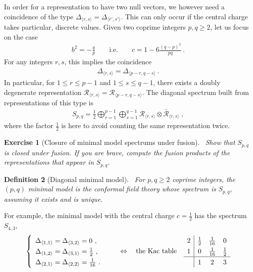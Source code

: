 \documentclass[12pt, a4paper]{article}
\theoremstyle{break}
\newtheorem{exo}{Exercise}[section]
\newtheorem{defn}[exo]{Definition}
\begin{document}
In order for a representation to have two null vectors, we however need a coincidence of 
the type $\Delta_{\langle r,s \rangle} = \Delta_{\langle r',s' \rangle}$. 
This can only occur if the central charge takes particular, discrete values. 
Given two coprime integers $p,q\geq 2$, let us focus on the case 
\begin{align} 
 b^2 = - \frac{q}{p} \qquad \text{i.e.} \qquad c = 1-6\frac{(q-p)^2}{pq}\ .
 \label{eq:bcmin}
\end{align}
For any integers $r,s$, this implies the coincidence 
\begin{align}
 \Delta_{\langle r,s \rangle} = \Delta_{\langle p-r, q-s\rangle}\ .
\end{align}
In particular, for $1\leq r\leq p-1$ and $1\leq s\leq q-1$, there exists a doubly degenerate representation $\mathcal{R}_{\langle r, s\rangle} = \mathcal{R}_{\langle p-r, q-s\rangle}$. The diagonal spectrum built from representations of this type is 
\begin{align}
 S_{p, q} = \frac12 \bigoplus_{r=1}^{p-1} \bigoplus_{s=1}^{q-1} \mathcal{R}_{\langle r,s \rangle}\otimes \mathcal{\bar{R}}_{\langle r,s \rangle}\ ,
\end{align}
where the factor $\frac12$ is here to avoid counting the same representation twice. 

\begin{exo}[Closure of minimal model spectrums under fusion]
 ~\label{exo:cmm}
 Show that $S_{p,q}$ is closed under fusion. If you are brave, compute the fusion products of the representations that appear in $S_{p,q}$.
\end{exo}

\begin{defn}[Diagonal minimal model]
 ~\label{def:dmm}
 For $p,q\geq 2$ coprime integers, the $(p,q)$ minimal model is the conformal field theory whose spectrum is $S_{p, q}$, assuming it exists and is unique.
\end{defn}
For example, the minimal model with the central charge $c=\frac12$ has the spectrum $S_{4,3}$, 
\begin{align}
\renewcommand{\arraystretch}{1.3}
 \left\{\begin{array}{l} \Delta_{\langle 1,1\rangle}=\Delta_{\langle 3,2\rangle} = 0 \ , \\ \Delta_{\langle 1,2\rangle} =\Delta_{\langle 3,1\rangle} = \frac12 \ , \\ \Delta_{\langle 2,1\rangle} =\Delta_{\langle 2,2\rangle} = \frac{1}{16} \ .\end{array}\right. 
 \qquad \Leftrightarrow \quad \text{the Kac table} \quad 
 \begin{array}{c|ccc} 2 & \frac{1}{2} & \frac{1}{16} & 0 \\ 1 & 0 & \frac{1}{16} & \frac{1}{2} \\  \hline & 1 & 2 & 3 \end{array} 
\end{align}
\end{document}
